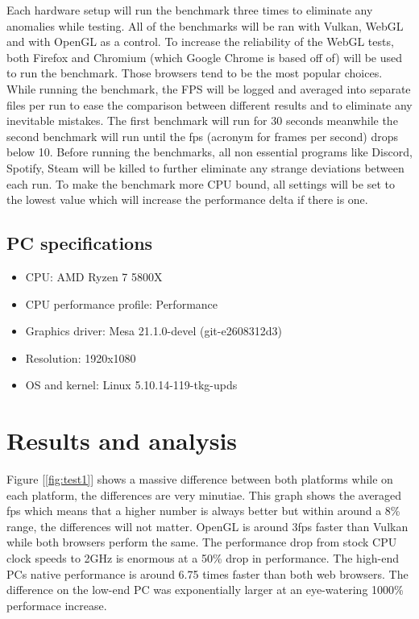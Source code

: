 \documentclass{article}
\begin{document}
Each hardware setup will run the benchmark three times to eliminate any anomalies while testing. All of the benchmarks will be ran with Vulkan, WebGL and with OpenGL as a control. To increase the reliability of the WebGL tests, both Firefox and Chromium (which Google Chrome is based off of) will be used to run the benchmark. Those browsers tend to be the most popular choices\cite{WebBrowsers}. While running the benchmark, the FPS will be logged and averaged into separate files per run to ease the comparison between different results and to eliminate any inevitable mistakes. The first benchmark will run for 30 seconds meanwhile the second benchmark will run until the fps (acronym for frames per second) drops below 10. Before running the benchmarks, all non essential programs like Discord, Spotify, Steam will be killed to further eliminate any strange deviations between each run. To make the benchmark more CPU bound, all settings will be set to the lowest value which will increase the performance delta if there is one.

\subsection {PC specifications}
\begin{itemize}
    \item CPU: AMD Ryzen 7 5800X
    \item CPU performance profile: Performance
    \item Graphics driver: Mesa 21.1.0-devel (git-e2608312d3)
    \item Resolution: 1920x1080
    \item OS and kernel: Linux 5.10.14-119-tkg-upds
\end{itemize}


\section {Results and analysis}
Figure [\ref{fig:test1}] shows a massive difference between both platforms while on each platform, the differences are very minutiae. This graph shows the averaged fps which means that a higher number is always better but within around a 8\% range, the differences will not matter. OpenGL is around 3fps faster than Vulkan while both browsers perform the same. The performance drop from stock CPU clock speeds to 2GHz is enormous at a 50\% drop in performance. The high-end PCs native performance is around 6.75 times faster than both web browsers. The difference on the low-end PC was exponentially larger at an eye-watering 1000\% performace increase.
\end{document}
